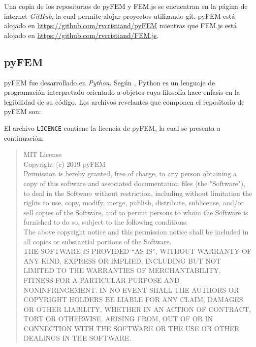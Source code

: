 Una copia de los repositorios de pyFEM y FEM.js se encuentran en la página de internet \emph{GitHub}, la cual permite alojar proyectos utilizando git. pyFEM está alojado en \url{https://github.com/rvcristiand/pyFEM} mientras que FEM.js está alojado en \url{https://github.com/rvcristiand/FEM.js}.\\

\subsection{pyFEM}

pyFEM fue desarrollado en \emph{Python}. Según \cite{lutz2013python}, Python es un lenguaje de programación interpretado orientado a objetos cuya filosofía hace enfasis en la legibilidad de su código. Los archivos revelantes que componen el repositorio de pyFEM son:
\pagebreak


\bigskip
El archivo \verb|LICENCE| contiene la licencia de pyFEM, la cual se presenta a continuación.

\begin{quotation}
  MIT License\\

  Copyright (c) 2019 pyFEM\\

  Permission is hereby granted, free of charge, to any person obtaining a copy of this software and associated documentation files (the "Software"), to deal in the Software without restriction, including without limitation the rights to use, copy, modify, merge, publish, distribute, sublicense, and/or sell copies of the Software, and to permit persons to whom the Software is furnished to do so, subject to the following conditions:\\
  
  The above copyright notice and this permission notice shall be included in all copies or substantial portions of the Software.\\

  THE SOFTWARE IS PROVIDED ``AS IS'', WITHOUT WARRANTY OF ANY KIND, EXPRESS OR IMPLIED, INCLUDING BUT NOT LIMITED TO THE WARRANTIES OF MERCHANTABILITY, FITNESS FOR A PARTICULAR PURPOSE AND NONINFRINGEMENT. IN NO EVENT SHALL THE AUTHORS OR COPYRIGHT HOLDERS BE LIABLE FOR ANY CLAIM, DAMAGES OR OTHER LIABILITY, WHETHER IN AN ACTION OF CONTRACT, TORT OR OTHERWISE, ARISING FROM, OUT OF OR IN CONNECTION WITH THE SOFTWARE OR THE USE OR OTHER DEALINGS IN THE SOFTWARE.
\end{quotation}

